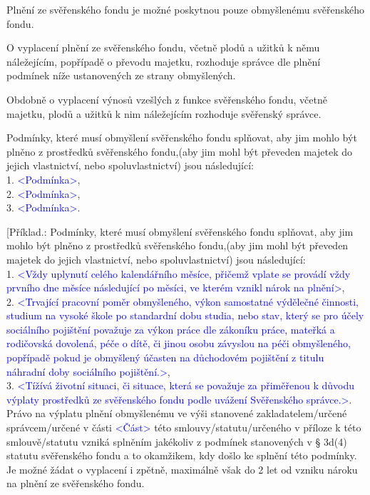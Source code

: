 \documentclass[parskip=half]{scrreprt}
\begin{document}
\begin{contract}

Plnění ze svěřenského fondu je možné poskytnou pouze obmyšlenému svěřenského fondu.

O vyplacení plnění ze svěřenského fondu, včetně plodů a užitků k němu náležejícím, popřípadě o převodu majetku, rozhoduje správce dle plnění podmínek níže ustanovených ze strany obmyšlených.

Obdobně o vyplacení výnosů vzešlých z funkce svěřenského fondu, včetně majetku, plodů a užitků k nim náležejícím rozhoduje svěřenský správce.

Podmínky, které musí obmyšlení svěřenského fondu splňovat, aby jim mohlo být plněno z prostředků svěřenského fondu,(aby jim mohl být převeden majetek do jejich vlastnictví, nebo spoluvlastnictví) jsou následující:\\
1. \textcolor{blue}{<Podmínka>},\\
2. \textcolor{blue}{<Podmínka>},\\
3. \textcolor{blue}{<Podmínka>}.

\parnumberfalse
[Příklad.: 
Podmínky, které musí obmyšlení svěřenského fondu splňovat, aby jim mohlo být plněno z prostředků svěřenského fondu,(aby jim mohl být převeden majetek do jejich vlastnictví, nebo spoluvlastnictví) jsou následující:\\
1. \textcolor{blue}{<Vždy uplynutí celého kalendářního měsíce, přičemž vplate se provádí vždy prvního dne měsíce následující po měsíci, ve kterém vznikl nárok na plnění>},\\
2. \textcolor{blue}{<Trvající pracovní poměr obmyšleného, výkon samostatné výdělečné činnosti, studium na vysoké škole po standardní dobu studia, nebo stav, který se pro účely sociálního pojištění považuje za výkon práce dle zákoníku práce, mateřká a rodičovská dovolená, péče o dítě, či jinou osobu závyslou na péči obmyšleného, popřípadě pokud je obmyšlený účasten na důchodovém pojištění z titulu náhradní doby sociálního pojištění.>},\\
3. \textcolor{blue}{<Tížívá životní situaci, či situace, která se považuje za přiměřenou k důvodu výplaty prostředků ze svěřenského fondu podle uvážení Svěřenského správce.>}.\\

Právo na výplatu plnění obmyšlenému ve výši stanovené zakladatelem/určené správcem/určené v části \textcolor{blue}{<Část>} této smlouvy/statutu/určeného v příloze k této smlouvě/statutu vzniká splněním jakékoliv z podmínek stanovených v § 3d(4) statutu svěřenského fondu a to okamžikem, kdy došlo ke splnění této podmínky. Je možné žádat o vyplacení i zpětně, maximálně však do 2 let od vzniku nároku na plnění ze svěřenského fondu.


\end{contract}
\end{document}
